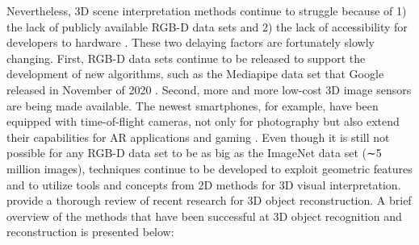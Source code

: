 Nevertheless, 3D scene interpretation methods continue to struggle because of 1) the lack of publicly available RGB-D data sets \cite{han2019image} and 2) the lack of accessibility for developers to hardware \cite{singh2018fotonnet}. These two delaying factors are fortunately slowly changing. First, RGB-D data sets continue to be released to support the development of new algorithms, such as the Mediapipe data set that Google released in November of 2020 \cite{objectron2021dataset}. Second, more and more low-cost 3D image sensors are being made available. The newest smartphones, for example, have been equipped with time-of-flight cameras, not only for photography but also extend their capabilities for AR applications and gaming \cite{tian2019occlusion}. Even though it is still not possible for any RGB-D data set to be as big as the ImageNet data set (∼5 million images), techniques continue to be developed to exploit geometric features and to utilize tools and concepts from 2D methods for 3D visual interpretation.
\textcite{han2019image} provide a thorough review of recent research for 3D object reconstruction. A brief overview of the methods that have been successful at 3D object recognition and reconstruction is presented below:
